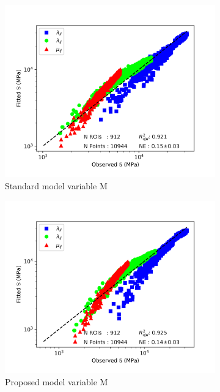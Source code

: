 \documentclass[a4paper,fleqn]{DC_ArtStyle}
\begin{document}
	\begin{figure}[!h]
		\centering
		\begin{subfigure}[b]{0.45\linewidth}
			\includegraphics[width=\linewidth]{RegressionFabric_Transverse}
			\caption{Standard model variable M}
		\end{subfigure}
		\begin{subfigure}[b]{0.45\linewidth}
			\includegraphics[width=\linewidth]{RegressionFabricK_Transverse}
			\caption{Proposed model variable M}
		\end{subfigure}
		\begin{subfigure}[b]{0.45\linewidth}

\end{subfigure}
\end{figure}
\end{document}
